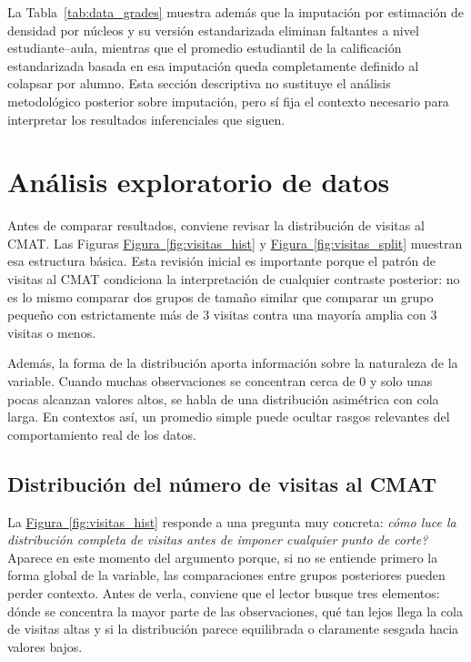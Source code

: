 \documentclass[10pt,letterpaper]{article} %
\numberwithin{figure}{subsection}
\begin{document}
\begin{table}[!htbp]
    \centering
    \caption{Resumen de variables de calificación utilizadas en el proceso analítico.}
    \label{tab:data_grades}
    
\end{table}

\begin{table}[!htbp]
    \centering
    \caption{Tokens no numéricos observados en la calificación cruda.}
    \label{tab:data_grade_tokens}
    
\end{table}

La Tabla~\ref{tab:data_grades} muestra además que la imputación por estimación de densidad por núcleos y su versión estandarizada eliminan faltantes a nivel estudiante--aula, mientras que el promedio estudiantil de la calificación estandarizada basada en esa imputación queda completamente definido al colapsar por alumno. Esta sección descriptiva no sustituye el análisis metodológico posterior sobre imputación, pero sí fija el contexto necesario para interpretar los resultados inferenciales que siguen.

\FloatBarrier
\section{Análisis exploratorio de datos}

Antes de comparar resultados, conviene revisar la distribución de visitas al CMAT. Las Figuras \hyperref[fig:visitas_hist]{Figura~\ref{fig:visitas_hist}} y \hyperref[fig:visitas_split]{Figura~\ref{fig:visitas_split}} muestran esa estructura básica. Esta revisión inicial es importante porque el patrón de visitas al CMAT condiciona la interpretación de cualquier contraste posterior: no es lo mismo comparar dos grupos de tamaño similar que comparar un grupo pequeño con estrictamente más de 3 visitas contra una mayoría amplia con 3 visitas o menos.

Además, la forma de la distribución aporta información sobre la naturaleza de la variable. Cuando muchas observaciones se concentran cerca de 0 y solo unas pocas alcanzan valores altos, se habla de una distribución asimétrica con cola larga. En contextos así, un promedio simple puede ocultar rasgos relevantes del comportamiento real de los datos.

\subsection{Distribución del número de visitas al CMAT}
La \hyperref[fig:visitas_hist]{Figura~\ref{fig:visitas_hist}} responde a una pregunta muy concreta: \emph{cómo luce la distribución completa de visitas antes de imponer cualquier punto de corte?} Aparece en este momento del argumento porque, si no se entiende primero la forma global de la variable, las comparaciones entre grupos posteriores pueden perder contexto. Antes de verla, conviene que el lector busque tres elementos: dónde se concentra la mayor parte de las observaciones, qué tan lejos llega la cola de visitas altas y si la distribución parece equilibrada o claramente sesgada hacia valores bajos.
\end{document}
